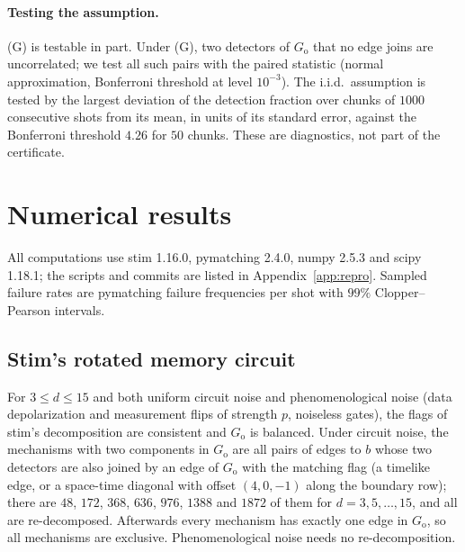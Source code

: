 \documentclass[11pt]{article}
\theoremstyle{plain}
\theoremstyle{definition}
\theoremstyle{remark}
\newcommand{\Go}{G_{\mathrm{o}}}
\renewcommand{\_}{\oldunderscore\allowbreak}
\begin{document}
\paragraph{Testing the assumption.} (G) is testable in part. Under (G), two detectors of $\Go$ that no edge joins are uncorrelated; we test all such pairs with the paired statistic (normal approximation, Bonferroni threshold at level $10^{-3}$). The i.i.d.\ assumption is tested by the largest deviation of the detection fraction over chunks of $1000$ consecutive shots from its mean, in units of its standard error, against the Bonferroni threshold $4.26$ for $50$ chunks. These are diagnostics, not part of the certificate.

\section{Numerical results}\label{sec:numerics}

All computations use stim 1.16.0, pymatching 2.4.0, numpy 2.5.3 and scipy 1.18.1; the scripts and commits are listed in Appendix~\ref{app:repro}. Sampled failure rates are pymatching failure frequencies per shot with $99\%$ Clopper--Pearson intervals.

\subsection{Stim's rotated memory circuit}

For $3\le d\le15$ and both uniform circuit noise and phenomenological noise (data depolarization and measurement flips of strength $p$, noiseless gates), the flags of stim's decomposition are consistent and $\Go$ is balanced. Under circuit noise, the mechanisms with two components in $\Go$ are all pairs of edges to $b$ whose two detectors are also joined by an edge of $\Go$ with the matching flag (a timelike edge, or a space-time diagonal with offset $(4,0,-1)$ along the boundary row); there are $48$, $172$, $368$, $636$, $976$, $1388$ and $1872$ of them for $d=3,5,\dots,15$, and all are re-decomposed. Afterwards every mechanism has exactly one edge in $\Go$, so all mechanisms are exclusive. Phenomenological noise needs no re-decomposition.
\end{document}
